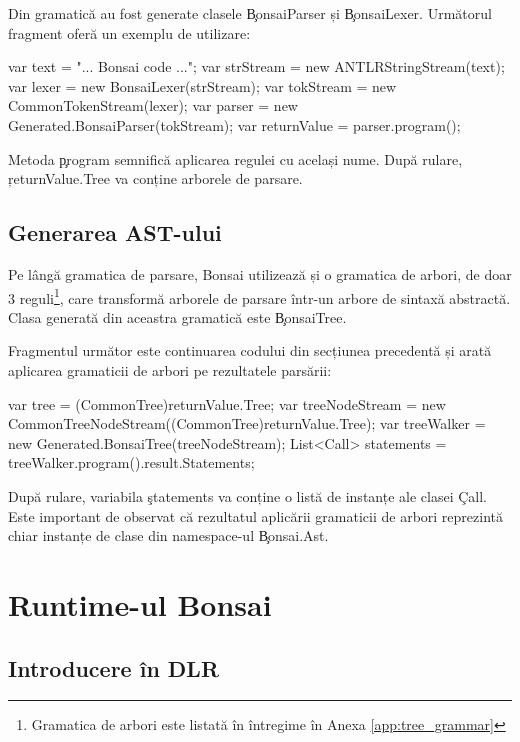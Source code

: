 \documentclass[12pt,a4paper]{memoir}
\begin{document}
Din gramatică au fost generate clasele \c{BonsaiParser} și \c{BonsaiLexer}. Următorul fragment oferă un exemplu de utilizare:

\begin{code}
var text = "... Bonsai code ...";
var strStream = new ANTLRStringStream(text);
var lexer = new BonsaiLexer(strStream);
var tokStream = new CommonTokenStream(lexer);
var parser = new Generated.BonsaiParser(tokStream);
var returnValue = parser.program();
\end{code}

Metoda \c{program} semnifică aplicarea regulei cu același nume. După rulare, \c{returnValue.Tree} va conține arborele de parsare.

\section{Generarea AST-ului}

Pe lângă gramatica de parsare, Bonsai utilizează și o gramatica de arbori, de doar 3 reguli\footnote{Gramatica de arbori este listată în întregime în Anexa \ref{app:tree_grammar}}, care transformă arborele de parsare într-un arbore de sintaxă abstractă. Clasa generată din aceastra gramatică este \c{BonsaiTree}.

Fragmentul următor este continuarea codului din secțiunea precedentă și arată aplicarea gramaticii de arbori pe rezultatele parsării:

\begin{code}
var tree = (CommonTree)returnValue.Tree;
var treeNodeStream = 
    new CommonTreeNodeStream((CommonTree)returnValue.Tree);
var treeWalker = new Generated.BonsaiTree(treeNodeStream);
List<Call> statements = treeWalker.program().result.Statements;
\end{code}

După rulare, variabila \c{statements} va conține o listă de instanțe ale clasei \c{Call}. Este important de observat că rezultatul aplicării gramaticii de arbori reprezintă chiar instanțe de clase din namespace-ul \c{Bonsai.Ast}.

\chapter{Runtime-ul Bonsai}

\section{Introducere în DLR}
\end{document}
